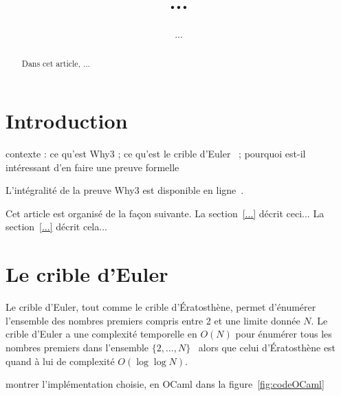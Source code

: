 \documentclass[a4paper]{easychair}
\begin{document}
\title{...}
\author{...}
\maketitle

\begin{abstract}
  Dans cet article, ...
\end{abstract}

\section{Introduction}

contexte : ce qu'est Why3 ; ce qu'est le crible d'Euler~\cite{crible-euler} ; pourquoi
est-il intéressant d'en faire une preuve formelle

L'intégralité de la preuve Why3 est disponible en ligne~\cite{mapreuve}.

Cet article est organisé de la façon suivante.
La section~\ref{...} décrit ceci...
La section~\ref{...} décrit cela...

\section{Le crible d'Euler}

Le crible d'Euler, tout comme le crible d'\'{E}ratosthène, permet d'énumérer
l'ensemble des nombres premiers compris entre 2 et une limite donnée $N$.
Le crible d'Euler a une complexité temporelle en $O(N)$ pour énumérer tous les
nombres premiers dans l'ensemble $\{2,...,N\}$~\cite{crible-euler} alors que celui
d'\'{E}ratosthène est quand à lui de complexité $O(\log\log N)$.

montrer l'implémentation choisie, en OCaml
dans la figure~\ref{fig:codeOCaml}
\end{document}
